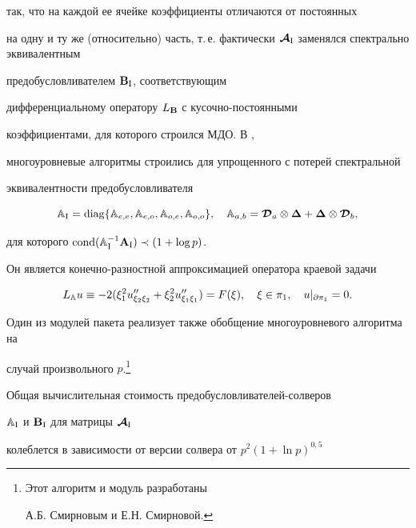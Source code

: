 так, что на каждой ее ячейке коэффициенты отличаются от постоянных


на одну и ту же (относительно) часть, т.\,е. фактически ${\bi


{\mc A}}_\ri$ заменялся спектрально эквивалентным


предобусловливателем ${\bold B}_{\mathrm{I}}$, соответствующим


дифференциальному оператору $L_{\bold B}$ с кусочно-постоянными


коэффициентами, для которого строился МДО. В \cite{B2002}, \cite{BSS2002}


многоуровневые алгоритмы строились для упрощенного с потерей спектральной


эквивалентности предобусловливателя


\begin{equation}\label{Gbeu}


{\Bbb A}_\ri = \diag\{{\Bbb A}_{e,e},{\Bbb A}_{e,o},


{\Bbb A}_{o,e},{\Bbb A}_{o,o}\}, \quad {\Bbb A}_{a,b}=\bi{\cal


D}_a\otimes \bi\Delta + \bi\Delta \otimes\bi{\cal D}_b,


\end{equation} 


для которого $\operatorname{cond}({\Bbb A}_{\mathrm{I}}^{-1}{\bold A}_{\mathrm{I}}) \prec (1+ \log p)$. 


Он является конечно-разностной аппроксимацией оператора краевой задачи


$$


L_{\Bbb A} u \equiv -2(\xi_1^2 u_{\xi_2\xi_2}''+\xi_2^2 u_{\xi_1\xi_1}'')=


F(\xi), \quad\xi\in\pi_1,\quad u|_{\partial \pi_1}=0.


$$


Один из модулей пакета реализует также обобщение многоуровневого алгоритма на


случай произвольного $p$.\footnote{Этот алгоритм и модуль разработаны


А.Б. Смирновым и Е.Н. Смирновой.}


\setcounter{footnote}{0}





Общая вычислительная стоимость предобусловливателей-солверов


${\Bbb A}_{\mathrm{I}}$ и ${\bold B}_{\mathrm{I}}$ для матрицы ${\boldsymbol {\cal {A}}}_{\mathrm{I}}$


колеблется в зависимости от версии солвера от $p^2(1+\ln p)^{0{,}5}$



